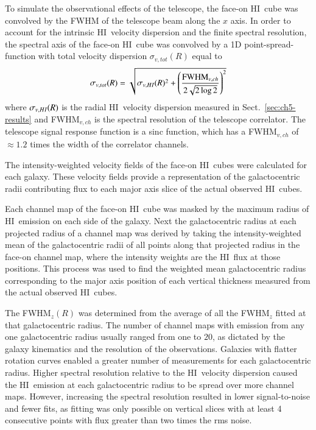 \documentclass[traditabstract]{aa} %
\newcommand\HI{H{\small I}}
\begin{document}
To simulate the observational effects of the telescope, the face-on
\HI\ cube was convolved by the FWHM of the telescope beam along the
$x$ axis. In order to account for the intrinsic \HI\ velocity
dispersion and the finite spectral resolution, the spectral axis of
the face-on \HI\ cube was convolved by a 1D point-spread-function
with total velocity dispersion $\sigma_{v,tot}(R)$ equal to
\begin{equation}
\label{eq:ch6-totdisp}
\sigma_{v,tot}(R) = \sqrt{\sigma_{v,\HI}(R)^2 +
  \left(\frac{{\rm FWHM}_{v,ch}}{2\sqrt{2 \log 2 }}\right)^2}
\end{equation}
where $\sigma_{v,\HI}(R)$ is the radial \HI\ velocity dispersion
measured in Sect.~\ref{sec:ch5-results} and FWHM$_{v,ch}$ is the spectral
resolution of the telescope correlator. The telescope signal response
function is a sinc function, which has a FWHM$_{v,ch}$ of $\approx
1.2$ times the width of the correlator channels.

The intensity-weighted velocity fields of the face-on \HI\ cubes
were calculated for each galaxy. These velocity fields provide a
representation of the galactocentric radii contributing flux to each
major axis slice of the actual observed \HI\ cubes.

Each channel map of the face-on \HI\ cube was masked by the
maximum radius of \HI\ emission on each side of the galaxy. Next the
galactocentric radius at each projected radius of a channel map was
derived by taking the intensity-weighted mean of the
galactocentric radii of all points along that projected radius in the
face-on channel map, where the intensity weights are the \HI\ flux at
those positions. This process was used to find the weighted mean
galactocentric radius
corresponding to the major axis position of each vertical thickness
measured from the actual observed \HI\ cubes.

The FWHM$_z(R)$ was determined from
the average of all the FWHM$_z$ fitted at that galactocentric radius. The
number of channel maps with emission from any one galactocentric
radius usually ranged from one to $20$, as dictated by the galaxy
kinematics and the resolution of the observations. Galaxies with
flatter rotation curves enabled a greater number of measurements for
each galactocentric radius. Higher spectral resolution relative to the
\HI\ velocity dispersion caused the \HI\ emission at each
galactocentric radius to be spread over more channel maps. However, 
increasing the spectral resolution resulted in lower signal-to-noise and fewer fits, 
as fitting was only possible on vertical 
slices with at least 4 consecutive points with flux greater than
two times the rms noise.
\end{document}
